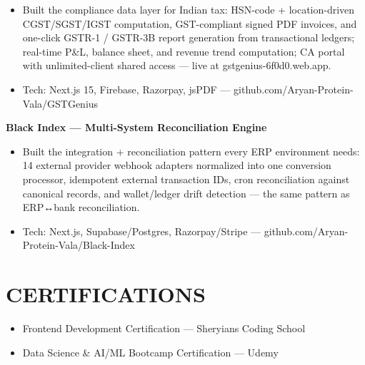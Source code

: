 \documentclass[9pt]{article}
\begin{document}
\begin{itemize}[leftmargin=11pt,itemsep=0pt,topsep=1pt,parsep=0pt]
\item Built the compliance data layer for Indian tax: HSN-code + location-driven CGST/SGST/IGST computation, GST-compliant signed PDF invoices, and one-click GSTR-1 / GSTR-3B report generation from transactional ledgers; real-time P\&L, balance sheet, and revenue trend computation; CA portal with unlimited-client shared access  ---  live at gstgenius-6f0d0.web.app.
\item Tech: Next.js 15, Firebase, Razorpay, jsPDF  ---  github.com/Aryan-Protein-Vala/GSTGenius
\end{itemize}
\textbf{Black Index  ---  Multi-System Reconciliation Engine}
\vspace{1pt}
\begin{itemize}[leftmargin=11pt,itemsep=0pt,topsep=1pt,parsep=0pt]
\item Built the integration + reconciliation pattern every ERP environment needs: 14 external provider webhook adapters normalized into one conversion processor, idempotent external transaction IDs, cron reconciliation against canonical records, and wallet/ledger drift detection  ---  the same pattern as ERP↔bank reconciliation.
\item Tech: Next.js, Supabase/Postgres, Razorpay/Stripe  ---  github.com/Aryan-Protein-Vala/Black-Index
\end{itemize}
\section*{CERTIFICATIONS}
\begin{itemize}[leftmargin=11pt,itemsep=0pt,topsep=1pt,parsep=0pt]
\item Frontend Development Certification  ---  Sheryians Coding School
\item Data Science \& AI/ML Bootcamp Certification  ---  Udemy
\end{itemize}
\end{document}

